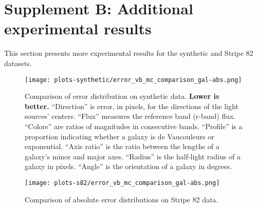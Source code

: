 \section*{Supplement B: Additional experimental results}
\label{experiment_plots}
This section presents more experimental results for the synthetic and Stripe 82 datasets.

\begin{figure}
  \centering
  \texttt{[image: plots-synthetic/error\_vb\_mc\_comparison\_gal-abs.png]}
  \caption{Comparison of error distribution on synthetic data.
  \textbf{Lower is better.}
  ``Direction'' is error, in pixels, for the directions of the light sources'
  centers.
  ``Flux'' measures the reference band (r-band) flux.
  ``Colors'' are ratios of magnitudes in consecutive bands.
  ``Profile'' is a proportion indicating whether a galaxy is de Vaucouleurs
  or exponential.
  ``Axis ratio'' is the ratio between the lengths of a galaxy's minor and
  major axes.
  ``Radius'' is the half-light radius of a galaxy in pixels.
  ``Angle'' is the orientation of a galaxy in degrees.}
\label{err-synth}
\end{figure}


\begin{figure}
  \centering
  \texttt{[image: plots-s82/error\_vb\_mc\_comparison\_gal-abs.png]}
  \caption{Comparison of absolute error distributions on Stripe 82 data.}
\label{err-real}
\end{figure}
